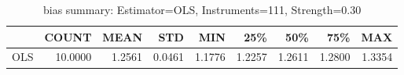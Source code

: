 \begin{table}[ht]
\centering
\caption{bias summary: Estimator=OLS, Instruments=111, Strength=0.30}
\begin{tabular}{lrrrrrrrr}
\toprule
 & COUNT & MEAN & STD & MIN & 25\% & 50\% & 75\% & MAX \\
\midrule
OLS & 10.0000 & 1.2561 & 0.0461 & 1.1776 & 1.2257 & 1.2611 & 1.2800 & 1.3354 \\
\bottomrule
\end{tabular}
\end{table}

